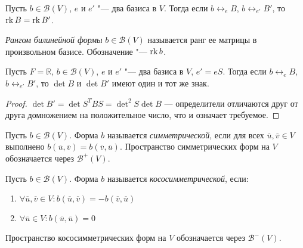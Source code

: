 \begin{corollary}
		Пусть $b \in \mathcal{B}(V)$, $e$ и $e'$ "--- два базиса в $V$. Тогда если $b \leftrightarrow_e B$, $b \leftrightarrow_{e'} B'$, то $\operatorname{rk}{B} = \operatorname{rk}{B'}$.
\end{corollary}

\begin{definition}
	\textit{Рангом билинейной формы} $b \in \mathcal{B}(V)$ называется ранг ее матрицы в произвольном базисе. Обозначение "--- $\operatorname{rk}{b}$.
\end{definition}

\begin{corollary}
	Пусть $F = \mathbb{R}$, $b \in \mathcal{B}(V)$, $e$ и $e'$ "--- два базиса в $V$, $e' = eS$. Тогда если $b \leftrightarrow_e B$, $b \leftrightarrow_{e'} B'$, то $\det{B}$ и $\det{B'}$ имеют один и тот же знак.
\end{corollary}

\begin{proof}
	$\det{B'} = \det{S^TBS} = \det^2{S}\det{B}$ --- определители отличаются друг от друга домножением на положительное число, что и означает требуемое.
\end{proof}

\begin{definition}
	Пусть $b \in \mathcal{B}(V)$. Форма $b$ называется \textit{симметрической}, если для всех $\overline{u}, \overline{v} \in V$ выполнено $b(\overline{u}, \overline{v}) = b(\overline{v}, \overline{u})$. Пространство симметрических форм на $V$ обозначается через $\mathcal{B}^+(V)$.
\end{definition}

\begin{definition}
	Пусть $b \in \mathcal{B}(V)$. Форма $b$ называется \textit{кососимметрической}, если:
	\begin{enumerate}
		\item $\forall \overline{u}, \overline{v} \in V: b(\overline{u}, \overline{v}) = -b(\overline{v}, \overline{u})$
		\item $\forall \overline{u} \in V: b(\overline{u}, \overline{u}) = 0$
	\end{enumerate}
	
	Пространство кососимметрических форм на $V$ обозначается через $\mathcal{B}^-(V)$.
\end{definition}

